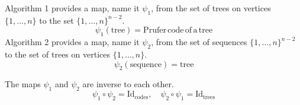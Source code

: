 \begin{theorem}
Algorithm 1 provides a map, name it $\psi _{1}$, from the set of trees on vertices $\{ 1,\dots,n \}$ to the set $\{ 1,\dots,n \}^{n-2}$.
$$
\psi_{1}(\mathrm{tree})=\mathrm{Prufer\,code\,of\,a\,tree}
$$
Algorithm 2 provides a map, name it $\psi_{2}$, from the set of sequences $\{ 1,\dots,n \}^{n-2}$ to the set of trees on vertices $\{ 1,\dots,n \}$.
$$
\psi_{2}(\mathrm{sequence})=\mathrm{tree}
$$

The maps $\psi_{1}$ and $\psi_{2}$ are inverse to each other.
$$
\psi_{1}\circ\psi_{2}=\mathrm{Id}_{\mathrm{codes}},\quad \psi_{2}\circ\psi_{1}=\mathrm{Id}_{\mathrm{trees}}
$$
\end{theorem}